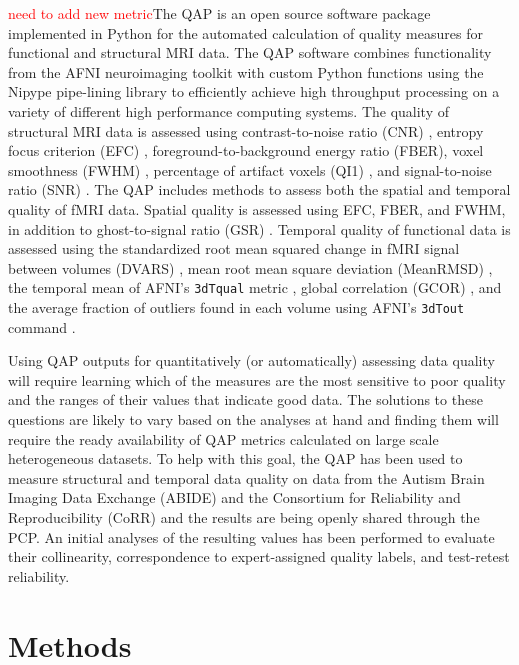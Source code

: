 \documentclass{frontiersSCNS} %
\newcommand\todo[1]{\textcolor{red}{#1}}
\begin{document}
\todo{need to add new metric}The QAP is an open source software package implemented in Python for the automated calculation of quality measures for functional and structural MRI data. The QAP software combines functionality from the AFNI \citep{cox1996} neuroimaging toolkit with custom Python functions using the Nipype pipe-lining library \citep{gorgolewski_2016_50186} to efficiently achieve high throughput processing on a variety of different high performance computing systems. The quality of structural MRI data is assessed using contrast-to-noise ratio (CNR) \citep{magnotta2006}, entropy focus criterion (EFC) \citep{atkinson1997}, foreground-to-background energy ratio (FBER), voxel smoothness (FWHM) \citep{friedman2008}, percentage of artifact voxels (QI1) \citep{mortamet2009}, and signal-to-noise ratio (SNR) \citep{magnotta2006}. The QAP includes methods to assess both the spatial and temporal quality of fMRI data. Spatial quality is assessed using EFC, FBER, and FWHM, in addition to ghost-to-signal ratio (GSR) \citep{giannelli2010}. Temporal quality of functional data is assessed using the standardized root mean squared change in fMRI signal between volumes (DVARS) \citep{power2012, Nichols2013}, mean root mean square deviation (MeanRMSD) \cite{Jenkinson99FD}, the temporal mean of AFNI’s \texttt{3dTqual} metric \citep{cox1996}, global correlation (GCOR) \citep{saad2013}, and the average fraction of outliers found in each volume using AFNI’s \texttt{3dTout} command \citep{cox1996}.

Using QAP outputs for quantitatively (or automatically) assessing data quality will require learning which of the measures are the most sensitive to poor quality and the ranges of their values that indicate good data. The solutions to these questions are likely to vary based on the analyses at hand and finding them will require the ready availability of QAP metrics calculated on large scale heterogeneous datasets. To help with this goal, the QAP has been used to measure structural and temporal data quality on data from the Autism Brain Imaging Data Exchange (ABIDE) \citep{dimartino2014} and the Consortium for Reliability and Reproducibility (CoRR) \citep{zuo2014} and the results are being openly shared through the PCP. An initial analyses of the resulting values has been performed to evaluate their collinearity, correspondence to expert-assigned quality labels, and test-retest reliability.


\section{Methods}
\label{sec:1}
\end{document}
